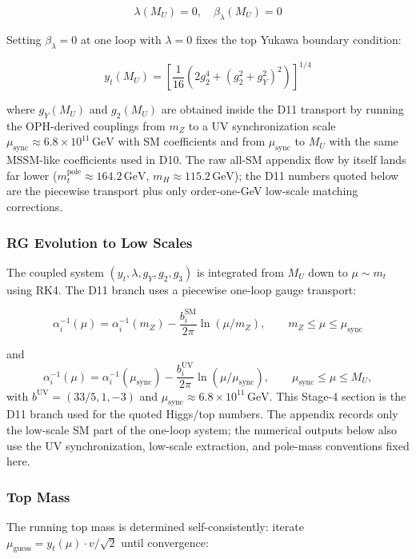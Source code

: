 \[\lambda(M_U) = 0, \quad \beta_\lambda(M_U) = 0\]

Setting \(\beta_\lambda = 0\) at one loop with \(\lambda = 0\) fixes the top Yukawa boundary condition:

\[y_t(M_U) = \left[\frac{1}{16}\left(2g_2^4 + (g_2^2 + g_Y^2)^2\right)\right]^{1/4}\]

where \(g_Y(M_U)\) and \(g_2(M_U)\) are obtained inside the D11 transport by running the OPH-derived couplings from \(m_Z\) to a UV synchronization scale \(\mu_{\mathrm{sync}}\approx 6.8\times 10^{11}\,\mathrm{GeV}\) with SM coefficients and from \(\mu_{\mathrm{sync}}\) to \(M_U\) with the same MSSM-like coefficients used in D10. The raw all-SM appendix flow by itself lands far lower (\(m_t^{\mathrm{pole}}\approx 164.2\,\mathrm{GeV}\), \(m_H\approx 115.2\,\mathrm{GeV}\)); the D11 numbers quoted below are the piecewise transport plus only order-one-GeV low-scale matching corrections.

\subsubsection{RG Evolution to Low Scales}\label{52-rg-evolution-to-low-scales}

The coupled system \((y_t, \lambda, g_Y, g_2, g_3)\) is integrated from \(M_U\) down to \(\mu \sim m_t\) using RK4. The D11 branch uses a piecewise one-loop gauge transport:

\[\alpha_i^{-1}(\mu) = \alpha_i^{-1}(m_Z) - \frac{b_i^{\text{SM}}}{2\pi}\ln(\mu/m_Z), \qquad m_Z \le \mu \le \mu_{\mathrm{sync}}\]

and
\[\alpha_i^{-1}(\mu) = \alpha_i^{-1}(\mu_{\mathrm{sync}}) - \frac{b_i^{\text{UV}}}{2\pi}\ln(\mu/\mu_{\mathrm{sync}}), \qquad \mu_{\mathrm{sync}} \le \mu \le M_U,\]
with \(b^{\text{UV}}=(33/5,1,-3)\) and \(\mu_{\mathrm{sync}}\approx 6.8\times 10^{11}\,\mathrm{GeV}\). This Stage-4 section is the D11 branch used for the quoted Higgs/top numbers. The appendix records only the low-scale SM part of the one-loop system; the numerical outputs below also use the UV synchronization, low-scale extraction, and pole-mass conventions fixed here.

\subsubsection{Top Mass}\label{53-top-mass}

The running top mass is determined self-consistently: iterate \(\mu_{\text{guess}} = y_t(\mu) \cdot v/\sqrt{2}\) until convergence:

